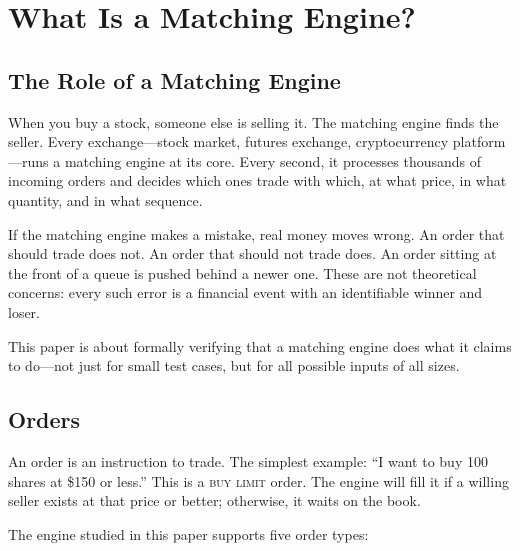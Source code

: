 \documentclass[11pt,a4paper]{article}
\begin{document}
\section{What Is a Matching Engine?}
\label{sec:intro}

\subsection{The Role of a Matching Engine}

When you buy a stock, someone else is selling it. The matching engine
finds the seller. Every exchange---stock market, futures exchange,
cryptocurrency platform---runs a matching engine at its core. Every
second, it processes thousands of incoming orders and decides which ones
trade with which, at what price, in what quantity, and in what sequence.

If the matching engine makes a mistake, real money moves wrong. An order
that should trade does not. An order that should not trade does. An
order sitting at the front of a queue is pushed behind a newer one.
These are not theoretical concerns: every such error is a financial
event with an identifiable winner and loser.

This paper is about formally verifying that a matching engine does what
it claims to do---not just for small test cases, but for all possible
inputs of all sizes.

\subsection{Orders}
\label{sec:orders-intro}

An order is an instruction to trade. The simplest example: ``I want to
buy 100 shares at \$150 or less.'' This is a \textsc{buy limit} order.
The engine will fill it if a willing seller exists at that price or
better; otherwise, it waits on the book.

The engine studied in this paper supports five order types:
\end{document}
